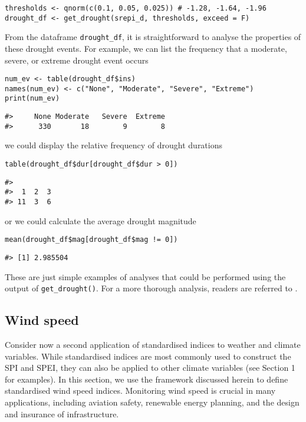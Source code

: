 \begin{verbatim}
thresholds <- qnorm(c(0.1, 0.05, 0.025)) # -1.28, -1.64, -1.96
drought_df <- get_drought(srepi_d, thresholds, exceed = F)
\end{verbatim}

From the dataframe \texttt{drought\_df}, it is straightforward to analyse the properties of these drought events. For example, we can list the frequency that a moderate, severe, or extreme drought event occurs

\begin{verbatim}
num_ev <- table(drought_df$ins)
names(num_ev) <- c("None", "Moderate", "Severe", "Extreme")
print(num_ev)
\end{verbatim}

\begin{verbatim}
#>     None Moderate   Severe  Extreme 
#>      330       18        9        8
\end{verbatim}

we could display the relative frequency of drought durations

\begin{verbatim}
table(drought_df$dur[drought_df$dur > 0])
\end{verbatim}

\begin{verbatim}
#> 
#>  1  2  3 
#> 11  3  6
\end{verbatim}

or we could calculate the average drought magnitude

\begin{verbatim}
mean(drought_df$mag[drought_df$mag != 0])
\end{verbatim}

\begin{verbatim}
#> [1] 2.985504
\end{verbatim}

These are just simple examples of analyses that could be performed using the output of \texttt{get\_drought()}. For a more thorough analysis, readers are referred to \cite{AllenOtero2023}.

\hypertarget{wind-speed}{%
\subsection{Wind speed}\label{wind-speed}}

Consider now a second application of standardised indices to weather and climate variables. While standardised indices are most commonly used to construct the SPI and SPEI, they can also be applied to other climate variables (see Section 1 for examples). In this section, we use the framework discussed herein to define standardised wind speed indices. Monitoring wind speed is crucial in many applications, including aviation safety, renewable energy planning, and the design and insurance of infrastructure.

